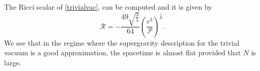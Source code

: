 \documentclass[11pt,english]{article}
\newcommand{\be}{\begin{equation}}
\newcommand{\ee}{\end{equation}}
\numberwithin{equation}{section}
\begin{document}
\noindent
The Ricci scalar of \eqref{trivialvac}, can be computed and it is given by 
\be 
\mathcal{R}=-\frac{49\sqrt{\frac{3}{5}}}{64}\left(\frac{r^3}{\mathcal{P}}\right)^{\frac{1}{2}}.
\ee 
We see that in the regime where the supergravity description for the trivial vacuum is a good approximation, the spacetime is almost flat provided that $N$ is large.  

\end{document}
